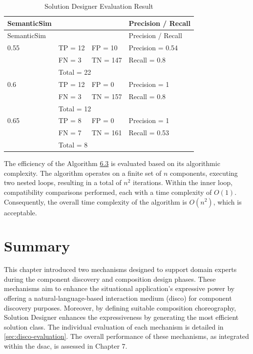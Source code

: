 \hypertarget{tbl:sd-result}{}
\begin{longtable}{@{}llll@{}}
\caption{\label{tbl:sd-result}Solution Designer Evaluation Result}\tabularnewline
\toprule

SemanticSim &  &  & Precision / Recall \tabularnewline
\midrule
\endfirsthead

\toprule
SemanticSim &  &  & Precision / Recall \tabularnewline
\midrule
\endhead

\bottomrule
\endlastfoot

0.55 & TP = 12 & FP = 10 & Precision = 0.54 \tabularnewline
 & FN = 3 & TN = 147 & Recall = 0.8 \tabularnewline
 & \multicolumn{3}{l}{Total = 22} \tabularnewline
\midrule

0.6 &TP = 12 & FP = 0 & Precision = 1 \tabularnewline
 & FN = 3 & TN = 157 & Recall = 0.8 \tabularnewline
 & \multicolumn{3}{l}{Total = 12} \tabularnewline
\midrule

0.65 & TP = 8 & FP = 0 & Precision = 1 \tabularnewline
 & FN = 7 & TN = 161 & Recall = 0.53 \tabularnewline
 & \multicolumn{3}{l}{Total = 8} \tabularnewline
\end{longtable}
\vspace{-15pt}

The efficiency of the Algorithm \hyperref[Algorithm63]{6.3} is evaluated
based on its algorithmic complexity. The algorithm operates on a finite
set of \(n\) components, executing two nested loops, resulting in a
total of \(n^{2}\) iterations. Within the inner loop, compatibility
comparisons performed, each with a time complexity of \(O(1)\).
Consequently, the overall time complexity of the algorithm is
\(O(n^{2})\), which is acceptable.

\pagebreak
\vspace{-15pt}
\hypertarget{sec:disc.summary}{%
\section{Summary}\label{sec:disc.summary}}
\vspace{10pt}

This chapter introduced two mechanisms designed to support domain experts during the component discovery and composition design phases. These mechanisms aim to enhance the situational application’s expressive power by offering a natural-language-based interaction medium (\gls{disco}) for component discovery purposes. Moreover, by defining suitable composition choreography, Solution Designer enhances the expressiveness by generating the most efficient solution class. The individual evaluation of each mechanism is detailed in \cref{sec:disco-evaluation}. The overall performance of these mechanisms, as integrated within the \gls{dsac}, is assessed in Chapter 7.
